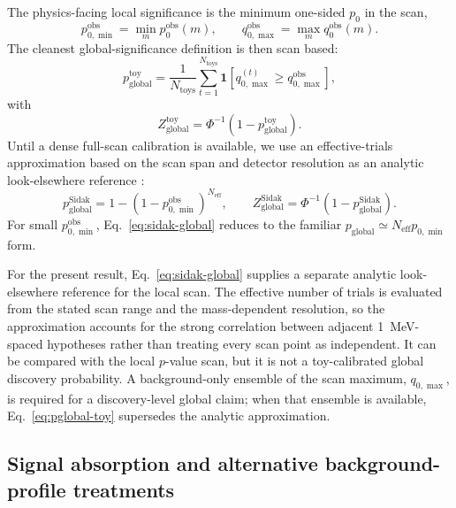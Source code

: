 The physics-facing local significance is the minimum one-sided $p_0$ in the scan,
\begin{equation}
p_{0,\min}^{\mathrm{obs}} = \min_m p_0^{\mathrm{obs}}(m),
\qquad
q_{0,\max}^{\mathrm{obs}} = \max_m q_0^{\mathrm{obs}}(m).
\end{equation}
The cleanest global-significance definition is then scan based:
\begin{equation}
p_{\mathrm{global}}^{\mathrm{toy}}
=
\frac{1}{N_{\mathrm{toys}}}
\sum_{t=1}^{N_{\mathrm{toys}}}
\mathbf{1}\!\left[
q_{0,\max}^{(t)} \ge q_{0,\max}^{\mathrm{obs}}
\right],
\label{eq:pglobal-toy}
\end{equation}
with
\begin{equation}
Z_{\mathrm{global}}^{\mathrm{toy}} = \Phi^{-1}\!\left(1-p_{\mathrm{global}}^{\mathrm{toy}}\right).
\end{equation}
Until a dense full-scan calibration is available, we use an effective-trials
approximation based on the scan span and detector resolution as an analytic
look-elsewhere reference \cite{GrossVitells2010}:
\begin{equation}
p_{\mathrm{global}}^{\mathrm{Sidak}}
=
1-\left(1-p_{0,\min}^{\mathrm{obs}}\right)^{N_{\mathrm{eff}}},
\qquad
Z_{\mathrm{global}}^{\mathrm{Sidak}}
=
\Phi^{-1}\!\left(1-p_{\mathrm{global}}^{\mathrm{Sidak}}\right).
\label{eq:sidak-global}
\end{equation}
For small $p_{0,\min}^{\mathrm{obs}}$, Eq.~\eqref{eq:sidak-global} reduces to the
familiar $p_{\mathrm{global}}\simeq N_{\mathrm{eff}}p_{0,\min}$ form.

For the present result, Eq.~\eqref{eq:sidak-global} supplies a separate analytic
look-elsewhere reference for the local scan. The effective number of trials is
evaluated from the stated scan range and the mass-dependent resolution, so the
approximation accounts for the strong correlation between adjacent
\SI{1}{MeV}-spaced hypotheses rather than treating every scan point as independent.
It can be compared with the local $p$-value scan, but it is not a toy-calibrated global
discovery probability. A background-only ensemble of the scan maximum,
$q_{0,\max}$, is required for a discovery-level global claim; when that ensemble is available,
Eq.~\eqref{eq:pglobal-toy} supersedes the analytic approximation.

\subsection{Signal absorption and alternative background-profile treatments}

